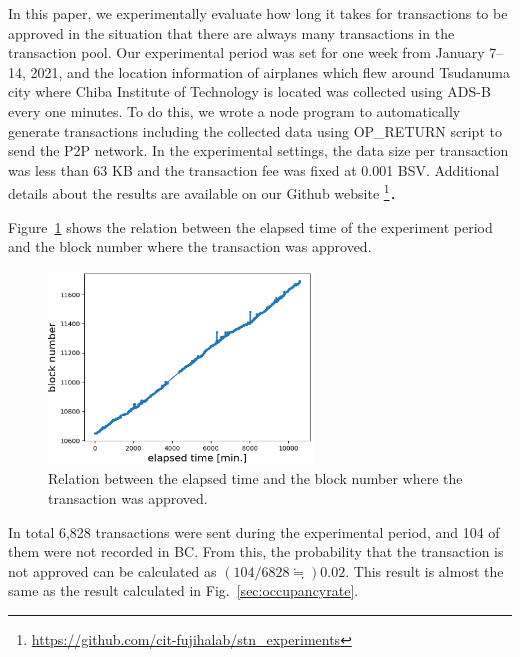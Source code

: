 \documentclass[graybox]{svmult}
\begin{document}
In this paper, we experimentally evaluate how long it takes for transactions to be approved in the situation that there are always many transactions in the transaction pool. 
Our experimental period was set for one week from January 7--14, 2021, and the location information of airplanes which flew around Tsudanuma city where Chiba Institute of Technology is located was collected using ADS-B \cite{flightradar24} every one minutes. 
To do this, we wrote a node program to automatically generate transactions including the collected data using OP\_RETURN script to send the P2P network. 
In the experimental settings, the data size per transaction was less than 63 KB and the transaction fee was fixed at 0.001 BSV. 
Additional details about the results are available on our Github website 
\footnote{\url{https://github.com/cit-fujihalab/stn_experiments}}．


Figure~\ref{fig:exp3-1} shows the relation between the elapsed time of the experiment period and the block number where the transaction was approved. 
%
\begin{figure}[tb]
  \begin{center}
    \includegraphics[width=70mm]{exp3-1.eps}
  \end{center}
  \caption{Relation between the elapsed time and the block number where the transaction was approved.}
  \label{fig:exp3-1}
\end{figure}
%
In total 6,828 transactions were sent during the experimental period, and 104 of them were not recorded in BC. 
From this, the probability that the transaction is not approved can be calculated as $(104/6828 \fallingdotseq) 0.02$.
This result is almost the same as the result calculated in Fig.~\ref{sec:occupancyrate}. 
\end{document}
